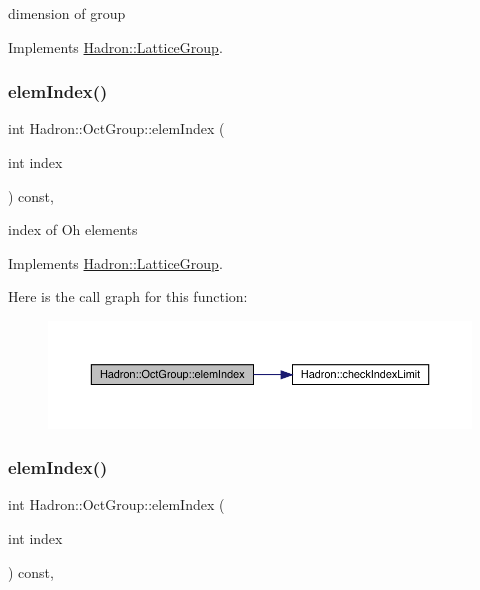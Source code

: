 dimension of group 

Implements \mbox{\hyperlink{structHadron_1_1LatticeGroup_abd8415698323796ef6a8605796ee3bea}{Hadron\+::\+Lattice\+Group}}.

\mbox{\label{structHadron_1_1OctGroup_a1410a74894e1d12337548245c4e6fd47}} 
\subsubsection{\texorpdfstring{elemIndex()}{elemIndex()}\hspace{0.1cm}{\footnotesize\ttfamily [1/3]}}
{\footnotesize\ttfamily int Hadron\+::\+Oct\+Group\+::elem\+Index (\begin{DoxyParamCaption}\item[{int}]{index }\end{DoxyParamCaption}) const\hspace{0.3cm}{\ttfamily [inline]}, {\ttfamily [virtual]}}

index of Oh elements 

Implements \mbox{\hyperlink{structHadron_1_1LatticeGroup_afb8e3ee60de059f75bce1044c694e1e8}{Hadron\+::\+Lattice\+Group}}.

Here is the call graph for this function\+:
\nopagebreak
\begin{figure}[H]
\begin{center}
\leavevmode
\includegraphics[width=350pt]{d1/de5/structHadron_1_1OctGroup_a1410a74894e1d12337548245c4e6fd47_cgraph}
\end{center}
\end{figure}
\mbox{\label{structHadron_1_1OctGroup_a1410a74894e1d12337548245c4e6fd47}} 
\subsubsection{\texorpdfstring{elemIndex()}{elemIndex()}\hspace{0.1cm}{\footnotesize\ttfamily [2/3]}}
{\footnotesize\ttfamily int Hadron\+::\+Oct\+Group\+::elem\+Index (\begin{DoxyParamCaption}\item[{int}]{index }\end{DoxyParamCaption}) const\hspace{0.3cm}{\ttfamily [inline]}, {\ttfamily [virtual]}}

